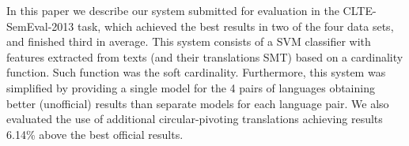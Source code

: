 In this paper we describe our system submitted for evaluation in the CLTE-SemEval-2013 task, which achieved the best results in two of the four data
 sets, and finished third in average. This system consists of a SVM classifier
 with features extracted from texts (and their translations SMT) based on a
 cardinality function. Such function was the soft cardinality. Furthermore, this
 system was simplified by providing a single model for the 4 pairs of languages
 obtaining better (unofficial) results than separate models for each language
 pair. We also evaluated the use of additional circular-pivoting translations
 achieving results 6.14\% above the best official results.

